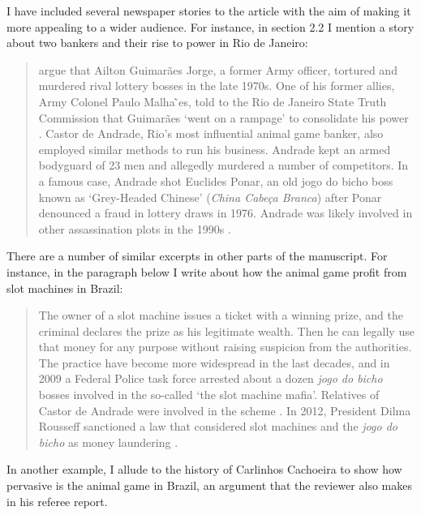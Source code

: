 \documentclass[a4paper,12pt]{article}
\begin{document}
\vspace{.25cm}

I have included several newspaper stories to the article with the aim of making it more appealing to a wider audience. For instance, in section 2.2 I mention a story about two bankers and their rise to power in Rio de Janeiro:

\begin{quote}
	\citet{jupiara2015poroes} argue that Ailton Guimarães Jorge, a former Army officer, tortured and murdered rival lottery bosses in the late 1970s. One of his former allies, Army Colonel Paulo Malha ̃es, told to the Rio de Janeiro State Truth Commission that Guimarães `went on a rampage' to consolidate his power \citep{belem2015guimaraes}. Castor de Andrade, Rio's most influential animal game banker, also employed similar methods to run his business. Andrade kept an armed bodyguard of 23 men and allegedly murdered a number of competitors. In a famous case, Andrade shot Euclides Ponar, an old jogo do bicho boss known as `Grey-Headed Chinese' (\textit{China Cabeça Branca}) after Ponar denounced a fraud in lottery draws in 1976. Andrade was likely involved in other assassination plots in the 1990s \citep{globo2017castor}.
\end{quote}

There are a number of similar excerpts in other parts of the manuscript. For instance, in the paragraph below I write about how the animal game profit from slot machines in Brazil: 

\begin{quote}
	The owner of a slot machine issues a ticket with a winning prize, and the criminal declares the prize as his legitimate wealth. Then he can legally use that money for any purpose without raising suspicion from the authorities. The practice have become more widespread in the last decades, and in 2009 a Federal Police task force arrested about a dozen \textit{jogo do bicho} bosses involved in the so-called `the slot machine mafia'. Relatives of Castor de Andrade were involved in the scheme \citep{estado2011cacaniquel}. In 2012, President Dilma Rousseff sanctioned a law that considered slot machines and the \textit{jogo do bicho} as money laundering \citep{agenciabrasil2012dilma}.
\end{quote}

In another example, I allude to the history of Carlinhos Cachoeira to show how pervasive is the animal game in Brazil, an argument that the reviewer also makes in his referee report.
\end{document}
